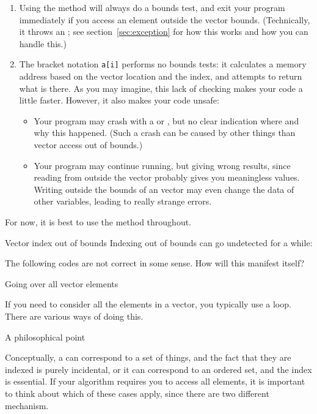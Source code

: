 \begin{enumerate}
\item Using the  method will always do a bounds test,
  and exit your program immediately if you access an element
  outside the vector bounds.
  (Technically, it throws an ;
  see section~\ref{sec:exception} for how this works and how you can handle this.)
\item The bracket notation \lstinline{a[i]} performs no bounds tests:
  it calculates a memory address based on the vector location and the index,
  and attempts to return what is there.
  As you may imagine, this lack of checking makes your code a little faster.
  However, it also makes your code unsafe:
  \begin{itemize}
  \item Your program may crash with a 
    or , but no clear indication where and why this happened.
    (Such a crash can be caused by other things than vector access out of bounds.)
  \item Your program may continue running, but  giving wrong results,
    since reading from outside the vector probably gives you meaningless values.
    Writing outside the bounds of an vector may even change the data of other variables,
    leading to really strange errors.
  \end{itemize}
\end{enumerate}
For now, it is best to use the  method throughout.

\begin{block}{Vector index out of bounds}
  Indexing out of bounds can go undetected for a while:
  
\end{block}

\begin{review}
  The following codes are not correct in some sense. How will this manifest itself?
\end{review}

 {Going over all vector elements}
\label{sec:arrayrange}

If you need to consider all the elements in a vector, you typically
use a  loop. There are various ways of doing this.

\begin{block}{A philosophical point}
  \label{sl:vector-access-types}

  Conceptually, a  can correspond to a set of things,
  and the fact that they are indexed is purely incidental,
  or it can correspond to an ordered set,
  and the index is essential.
  If your algorithm requires you to access all elements,
  it is important to think about which of these cases apply,
  since there are two different mechanism.
\end{block}

